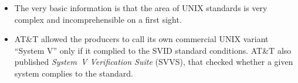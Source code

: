 \documentclass[article]{seminar}
\newcommand{\sltitle}[1]{{\centering\textbf{\Large #1}
    \vskip 2em plus 0pt minus 2em\par}} %
\newcommand{\emsl}[1]{\textbf{#1}} %
\begin{document}

\label{UNIXSTANDARDS}

\begin{itemize}
\item The very basic information is that the area of UNIX standards is very
complex and incomprehensible on a first sight.
\item AT\&T allowed the producers to call its own commercial UNIX variant
``System V'' only if it complied to the SVID standard conditions. AT\&T also
published \emph{System~V Verification Suite} (SVVS), that checked whether a given
system complies to the standard.
\end{itemize}
\end{document}

